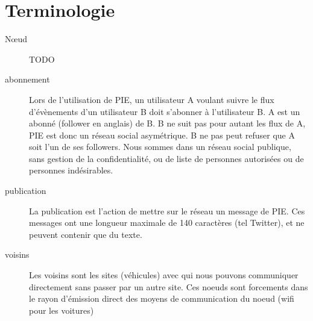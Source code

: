 
\section{Terminologie}

\begin{description}

\item[N\oe ud] TODO

\item[abonnement]
Lors de l'utilisation de PIE, un utilisateur A voulant suivre le flux d'évènements d'un utilisateur B doit s'abonner à l'utilisateur B.
A est un abonné (follower en anglais) de B. B ne suit pas pour autant les flux de A, PIE est donc un réseau social asymétrique.
B ne pas peut refuser que A soit l'un de ses followers. Nous sommes dans un réseau social publique, sans gestion de la confidentialité, ou de liste de personnes autorisées ou de personnes indésirables.

\item[publication]
La publication est l'action de mettre sur le réseau un message de PIE. Ces messages ont une longueur maximale de 140 caractères (tel Twitter), et ne peuvent contenir que du texte.  

\item[voisins]
Les voisins sont les sites (véhicules) avec qui nous pouvons communiquer directement sans passer par un autre site. Ces noeuds sont forcements dans le rayon d'émission direct des moyens de communication du noeud (wifi pour les voitures)

\end{description}

